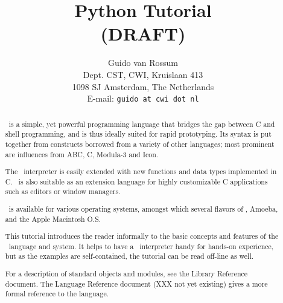 
\usepackage{myformat}


\title{\bf
	Python Tutorial \\
	(DRAFT)
}

\author{
	Guido van Rossum \\
	Dept. CST, CWI, Kruislaan 413 \\
	1098 SJ Amsterdam, The Netherlands \\
	E-mail: {\tt guido at cwi dot nl} %
}




\maketitle

\begin{abstract}

\noindent
\Python\ is a simple, yet powerful programming language that bridges the
gap between C and shell programming, and is thus ideally suited for rapid
prototyping.
Its syntax is put together from constructs borrowed from a variety of other
languages; most prominent are influences from ABC, C, Modula-3 and Icon.

The \Python\ interpreter is easily extended with new functions and data
types implemented in C.
\Python\ is also suitable as an extension language for highly
customizable C applications such as editors or window managers.

\Python\ is available for various operating systems, amongst which
several flavors of \UNIX, Amoeba, and the Apple Macintosh O.S.

This tutorial introduces the reader informally to the basic concepts and
features of the \Python\ language and system.
It helps to have a \Python\ interpreter handy for hands-on experience,
but as the examples are self-contained, the tutorial can be read
off-line as well.

For a description of standard objects and modules, see the Library
Reference document.
The Language Reference document (XXX not yet existing)
gives a more formal reference to the language.

\end{abstract}

\pagebreak

